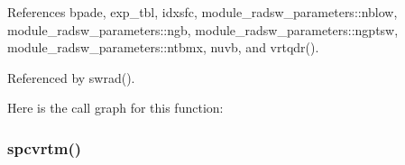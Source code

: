 References bpade, exp\+\_\+tbl, idxsfc, module\+\_\+radsw\+\_\+parameters\+::nblow, module\+\_\+radsw\+\_\+parameters\+::ngb, module\+\_\+radsw\+\_\+parameters\+::ngptsw, module\+\_\+radsw\+\_\+parameters\+::ntbmx, nuvb, and vrtqdr().



Referenced by swrad().

Here is the call graph for this function\+:
\mbox{\label{group__module__radsw__main_ga859cc14063a58e9d0a252e4366b9fff3}} 
\subsubsection{\texorpdfstring{spcvrtm()}{spcvrtm()}}
